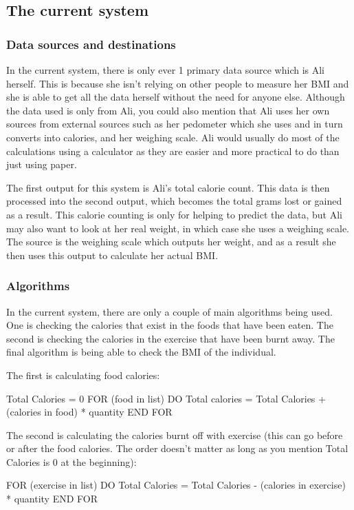 \subsection{The current system}

\subsubsection{Data sources and destinations}
In the current system, there is only ever 1 primary data source which is Ali herself. This is because she isn't relying on other people to measure her BMI and she is able to get all the data herself without the need for anyone else. Although the data used is only from Ali, you could also mention that Ali uses her own sources from external sources such as her pedometer which she uses and in turn converts into calories, and her weighing scale. Ali would usually do most of the calculations using a calculator as they are easier and more practical to do than just using paper.

The first output for this system is Ali's total calorie count. This data is then processed into the second output, which becomes the total grams lost or gained as a result. This calorie counting is only for helping to predict the data, but Ali may also want to look at her real weight, in which case she uses a weighing scale. The source is the weighing scale which outputs her weight, and as a result she then uses this output to calculate her actual BMI.

\subsubsection{Algorithms}
In the current system, there are only a couple of main algorithms being used. One is checking the calories that exist in the foods that have been eaten. The second is checking the calories in the exercise that have been burnt away. The final algorithm is being able to check the BMI of the individual.

The first is calculating food calories:

Total Calories = 0
FOR (food in list) DO
	Total calories = Total Calories + (calories in food) * quantity
END FOR

The second is calculating the calories burnt off with exercise (this can go before or after the food calories. The order doesn't matter as long as you mention Total Calories is 0 at the beginning):

FOR (exercise in list) DO
	Total Calories = Total Calories - (calories in exercise) * quantity
END FOR

